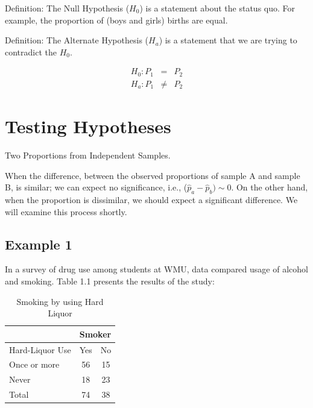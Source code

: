 \documentclass[11pt, chapterprefix=true]{scrbook}\usepackage[]{graphicx}\usepackage[]{color}
\begin{document}
Definition: The Null Hypothesis ($H_0$) is a statement about the status quo.  For example,  the proportion of (boys and girls) births are equal.

Definition: The Alternate Hypothesis ($H_a$) is a statement that we are trying to contradict the $H_0$.

\begin{eqnarray*}
  H_0: P_1 &=& P_2 \\
  H_a: P_1 &\ne& P_2 
\end{eqnarray*}  

\section{Testing Hypotheses } Two Proportions from Independent Samples.

When the difference, between the observed proportions of sample A and sample B, is similar; we can expect no significance, i.e., ($\hat{p}_a - \hat{p}_b) \sim 0$.  On the other hand, when the proportion is dissimilar, we should expect a significant difference.  We will examine this process shortly.

\subsection{Example 1}

In a survey of drug use among students at WMU, data compared usage of alcohol and smoking. Table 1.1 presents the results of the study:

\begin{table}[htbp]
   \centering
   \caption{Smoking by using Hard Liquor}
   \begin{tabular}{@{} lcc @{}} \hline %
     &  \multicolumn{2}{c}{Smoker} \\ \hline 
     Hard-Liquor Use & Yes & No \\ \hline
     Once or more & 56 & 15 \\
     Never        & 18 & 23 \\  \hline
     Total        & 74 & 38 \\ \hline
   \end{tabular}
   
   \label{tab:c10_1}
\end{table}
\end{document}
